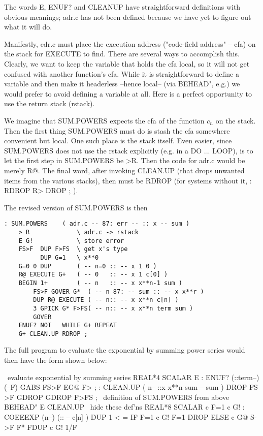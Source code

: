 The words E, ENUF? and CLEANUP have straightforward definitions with obvious meanings; adr.c has not been defined because we have yet to figure out what it will do.

Manifestly, edr.c must place the execution address ("code-field address" -- cfa) on the stack for EXECUTE to find. There are several ways to accomplish this. Clearly, we want to keep the variable that holds the cfa local, so it will not get confused with another function's cfa. While it is straightforward to define a variable and then make it headerless --hence local-- (via BEHEAD", e.g.) we would prefer to avoid defining a variable at all. Here is a perfect opportunity to use the return stack (rstack).

We imagine that SUM.POWERS expects the cfa of the function $c_n$ on the stack. Then the first thing SUM.POWERS must do is stash the cfa somewhere convenient but local. One such place is the stack itself. Even easier, since SUM.POWERS does not use the rstack explicitly (e.g. in a DO ... LOOP), is to let the first step in SUM.POWERS be >R. Then the code for adr.c would be merely R@. The final word, after invoking CLEAN.UP (that drops unwanted items from the various stacks), then must be RDROP (for systems without it, : RDROP R> DROP ; ).

The revised version of SUM.POWERS is then
\begin{lstlisting}
: SUM.POWERS    ( adr.c -- 87: err -- :: x -- sum )
    > R             \ adr.c -> rstack
    E G!            \ store error
    FS>F  DUP F>FS  \ get x's type
          DUP G=1   \ x**0
    G=0 0 DUP       ( -- n=0 :: -- x 1 0 )
    R@ EXECUTE G+   ( -- 0   :: -- x 1 c[0] )
    BEGIN 1+        ( -- n   :: -- x x**n-1 sum )
        FS>F GOVER G*  ( -- n 87: -- sum :: -- x x**r )
        DUP R@ EXECUTE ( -- n:: -- x x**n c[n] )
        3 GPICK G* F>FS( -- n:: -- x x**n term sum )
        GOVER
    ENUF? NOT   WHILE G+ REPEAT
    G+ CLEAN.UP RDROP ;
\end{lstlisting}

The full program to evaluate the exponential by summing power series would then have the form shown below:

\ evaluate exponential by summing series
REAL*4 SCALAR E
: ENUF? (::term--) (--F)
    GABS FS>F EG@ F> ;
: CLEAN.UP ( n-- ::x x**n sum -- sum )
    DROP FS >F
    GDROP GDROP F>FS ;
\ definition of SUM.POWERS from above
BEHEAD" E CLEAN.UP \ hide these def'ns
REAL*8 SCALAR c F=1 c G!
: COEEEXP (n--) (:: -- c[n] )
    DUP 1 < =
    IF F=1 c G! F=1 DROP
    ELSE c G@ S->F
        F* FDUP c G! 1/F


